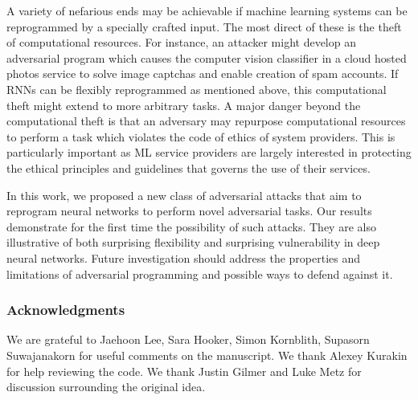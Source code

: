 \documentclass{article}
\begin{document}
A variety of nefarious ends may be achievable if machine learning systems can be reprogrammed by a specially crafted input. 
The most direct of these is the theft of computational resources. 
For instance, an attacker might develop an adversarial program which causes the computer vision classifier in a cloud hosted photos service
 to solve image captchas and enable creation of spam accounts. 
If RNNs can be flexibly reprogrammed as 
mentioned above, this computational theft might extend to more arbitrary tasks.
A major danger beyond the computational theft is that an adversary may repurpose computational resources to perform a task which violates the code of ethics of system providers. This is particularly important as ML service providers are largely interested in protecting the ethical principles and guidelines that governs the use of their services. 

In this work, we proposed a new class of adversarial attacks that aim to reprogram neural networks to perform novel adversarial tasks. 
Our results demonstrate for the first time the possibility of such attacks. 
They are also illustrative of 
both surprising flexibility and surprising vulnerability in deep neural networks. 
Future investigation should address the properties and limitations of adversarial programming and possible ways to defend against it.



\subsubsection*{Acknowledgments}
We are grateful to Jaehoon Lee, Sara Hooker, Simon Kornblith, Supasorn Suwajanakorn for useful comments on the manuscript. We thank Alexey Kurakin for help reviewing the code. We thank Justin Gilmer and Luke Metz for discussion surrounding the original idea.





\end{document}
